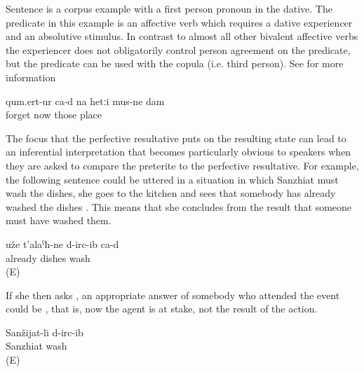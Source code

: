 Sentence  is a corpus example with a first person pronoun in the dative. The predicate in this example is an affective verb which requires a dative experiencer and an absolutive stimulus. In contrast to almost all other bivalent affective verbs the experiencer does not obligatorily control person agreement on the predicate, but the predicate can be used with the copula (i.e. third person). See  for more information

\begin{exe}
	\ex	\label{ex:Now I have forgotten those places analytic}
	\gll	qum.ert-ur ca-d	na	hetːi	mus-ne	dam\\
		forget 	now	those	place	\\
	\glt	{}
\end{exe}


The focus that the perfective resultative puts on the resulting state can lead to an inferential interpretation that becomes particularly obvious to speakers when they are asked to compare the preterite to the perfective resultative. For example, the following sentence could be uttered in a situation in which Sanzhiat must wash the dishes, she goes to the kitchen and sees that somebody has already washed the dishes . This means that she concludes from the result that someone must have washed them.
%
\begin{exe}
	\ex	\label{ex:The dishes have already been washed}
	\gll	uže	t'alaˁħ-ne	d-irc-ib	ca-d\\
		already	dishes	wash	\\
	\glt	{} (E)
\end{exe}

If she then asks  , an appropriate answer of somebody who attended the event could be , that is, now the agent is at stake, not the result of the action.
%
\begin{exe}
	\ex	\label{ex:Sanzhiat washed (them)}
	\gll	Sanžijat-li	d-irc-ib\\
		Sanzhiat	wash\\
	\glt	{} (E)
\end{exe}


